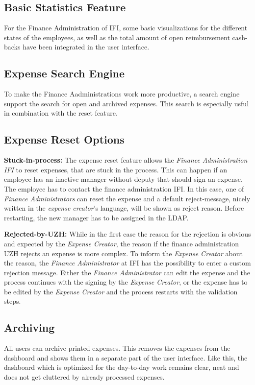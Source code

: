 \subsection{Basic Statistics Feature}
For the Finance Administration of IFI, some basic visualizations for the different states of the employees, as well as the total amount of open reimbursement cash-backs have been integrated in the user interface.

\subsection{Expense Search Engine}
To make the Finance Aadministrations work more productive, a search engine support the search for open and archived expenses. This search is especially usful in combination with the reset feature.

\subsection{Expense Reset Options}
\textbf{Stuck-in-process:} The expense reset feature allows the \textit{Finance Administration IFI} to reset expenses, that are stuck in the process. This can happen if an employee has an inactive manager without deputy that should sign an expense. The employee has to contact the finance administration IFI. In this case, one of \textit{Finance Administrators} can reset the expense and a default reject-message, nicely written in the \textit{expense creator}'s language, will be shown as reject reason. Before restarting, the new manager has to be assigned in the LDAP. \par

\textbf{Rejected-by-UZH:} While in the first case the reason for the rejection is obvious and expected by the \textit{Expense Creator}, the reason if the finance administration UZH rejects an expense is more complex. To inform the \textit{Expense Creator} about the reason, the \textit{Finance Administrator} at IFI has the possibility to enter a custom rejection message. Either the \textit{Finance Administrator} can edit the expense and the process continues with the signing by the \textit{Expense Creator}, or the expense has to be edited by the \textit{Expense Creator} and the process restarts with the validation steps.

\subsection{Archiving}
All users can archive printed expenses. This removes the expenses from the dashboard and shows them in a separate part of the user interface. Like this, the dashboard which is optimized for the day-to-day work remains clear, neat and does not get cluttered by already processed expenses.

